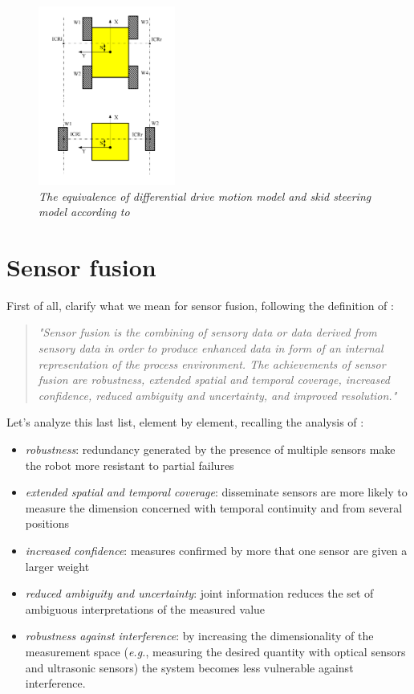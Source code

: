 \begin{figure}
	\centering
	\includegraphics[width=0.4\textwidth]{Images/background_and_tools/diffSkidEquivalence.png}
	\caption{\textit{The equivalence of differential drive motion model and skid steering model according to \cite{skid2diff}}}
	\label{fig:husky}
\end{figure}

\section{Sensor fusion}\label{sec:sensorFusion}

First of all, clarify what we mean for sensor fusion, following the definition of  \cite{sensorFusionDef}:
\blockquote{\textit{
"Sensor fusion is the combining of sensory data or data derived from sensory
data in order to produce enhanced data in form of an internal representation
of the process environment. The achievements of sensor fusion are
robustness, extended spatial and temporal coverage, increased confidence,
reduced ambiguity and uncertainty, and improved resolution."}}
Let's analyze this last list, element by element, recalling the analysis of \cite{sensorFusionAdvantages}:
\begin{itemize}
	\item \textit{robustness}: redundancy generated by the presence of multiple sensors make the robot more resistant to partial failures
	\item \textit{extended spatial and temporal coverage}: disseminate sensors are more likely to measure the dimension concerned with temporal continuity and from several positions
	\item \textit{increased confidence}: measures confirmed by more that one sensor are given a larger weight
	\item \textit{reduced ambiguity and uncertainty}: joint information reduces the set
of ambiguous interpretations of the measured value
	\item \textit{robustness against interference}:  by increasing the dimensionality of
the measurement space (\textit{e.g.}, measuring the desired quantity with optical sensors and ultrasonic sensors) the system becomes less vulnerable
against interference.
\end{itemize}


